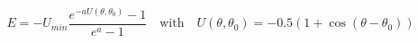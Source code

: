 


$$
E=-U_{min} 
\frac{e^{-a U(\theta,\theta_0)}-1}{e^a-1}
\quad\mbox{with}\quad
U(\theta,\theta_0)
=-0.5 \left(1+\cos(\theta-\theta_0) \right)
$$


